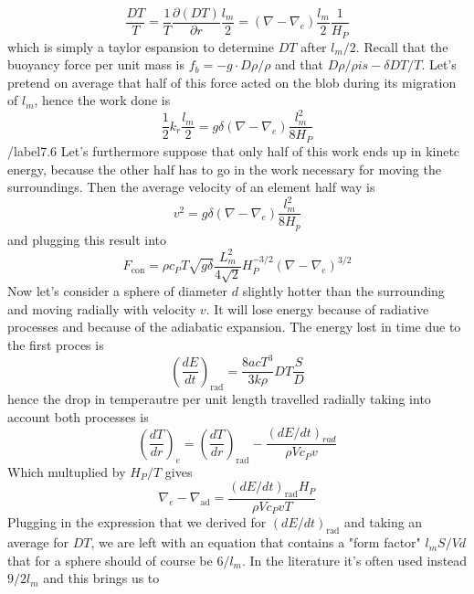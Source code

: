 \documentclass[11pt]{article}
\begin{document}
\begin{equation}
	\frac{DT}{T}=\frac{1}{T}\frac{\partial (DT)}{\partial r} \frac{l_m}{2}=(\nabla-\nabla_e)\frac{l_m}{2}\frac{1}{H_P}
\end{equation}
which is simply a taylor espansion to determine $DT$ after $l_m/2$. Recall that the buoyancy force per unit mass is $f_b=-g \cdot D \rho / \rho$ and that $D \rho / \rho is - \delta D T / T$. Let's pretend on average that half of this force acted on the blob during its migration of $l_m$, hence the work done is
\begin{equation}
	\frac{1}{2} k_r \frac{l_m}{2}=g \delta (\nabla - \nabla_e)\frac{l_m^2}{8 H_P}
\end{equation}/label{7.6}
Let's furthermore suppose that only half of this work ends up in kinetc energy, because the other half has to go in the work necessary for moving the surroundings. Then the average velocity of an element half way is
\begin{equation}
	v^2=g \delta (\nabla - \nabla_e)\frac{l_m^2}{8 H_p}
\end{equation}
and plugging this result into \label{fconv}
\begin{equation}
F_{\mathrm{con}}= \rho c_P T \sqrt{g \delta} \frac{L^2_m}{4\sqrt{2}}H_P^{-3/2} (\nabla-\nabla_e)^{3/2}
\end{equation}
Now let's consider a sphere of diameter $d$ slightly hotter than the surrounding and moving radially with velocity $v$. It will lose energy because of radiative processes and because of the adiabatic expansion. The energy lost in time due to the first proces is
\begin{equation}
\left (\frac{d E}{d t}  \right )_{\mathrm{rad}} = \frac{8 a c T^3}{3 k \rho} DT \frac{S}{D}
\end{equation}
hence the drop in temperautre per unit length travelled radially taking into account both processes is
\begin{equation}\label{7.7}
\left (  \frac{d T}{d r }   \right )_e = \left(  \frac{dT}{d r }   \right )_{\mathrm{rad}} - \frac{\left( d E / dt \right)_{rad} }{\rho V c_P v}
\end{equation}
Which multuplied by $H_P/T$ gives
\begin{equation}
\nabla_e - \nabla_{\mathrm{ad}} =  \frac{\left( dE/dt \right)_{ \mathrm{rad} } H_P}{\rho V c_P v T}
\end{equation}
Plugging in the expression that we derived for $(dE/dt)_{\mathrm{rad}}$ and taking an average for $DT$, we are left with an equation that contains a "form factor" $l_m S/Vd$ that for a sphere should of course be $6/l_m$. In the literature it's often used instead $9/2l_m$ and this brings us to
\end{document}
